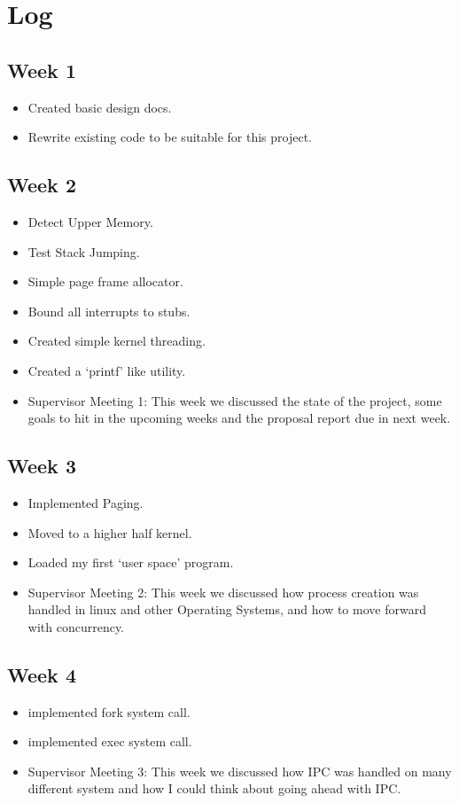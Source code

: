 \documentclass[a4paper]{report}
\begin{document}
\chapter{Log}


\section*{Week 1}
\begin{itemize}
\item Created basic design docs.
\item Rewrite existing code to be suitable for this project.
\end{itemize}

\section*{Week 2}
\begin{itemize}
\item Detect Upper Memory.
\item Test Stack Jumping.
\item Simple page frame allocator.
\item Bound all interrupts to stubs.
\item Created simple kernel threading.
\item Created a `printf' like utility.
\item Supervisor Meeting 1: This week we discussed the state of the project, some goals to hit in the upcoming weeks and the proposal report due in next week.
\end{itemize}

\section*{Week 3}
\begin{itemize}
\item Implemented Paging.
\item Moved to a higher half kernel.
\item Loaded my first `user space' program.
\item Supervisor Meeting 2: This week we discussed how process creation was handled in linux and other Operating Systems, and how to move forward with concurrency.
\end{itemize}

\section*{Week 4}
\begin{itemize}
\item implemented fork system call.
\item implemented exec system call.
\item Supervisor Meeting 3: This week we discussed how IPC was handled on many different system and how I could think about going ahead with IPC.
\end{itemize}
\end{document}
